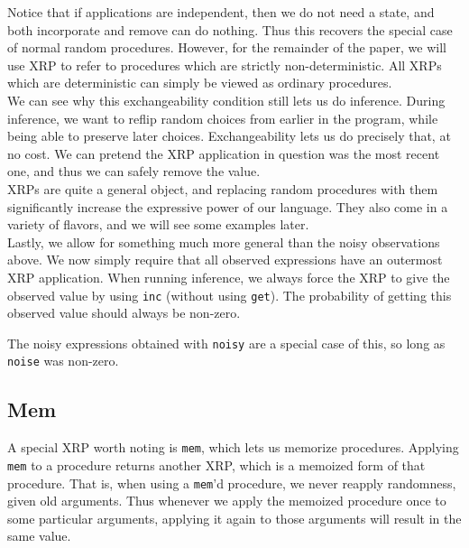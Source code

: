 \documentclass[10pt]{article}
\begin{document}
Notice that if applications are independent, then we do not need a state, and both incorporate and remove can do nothing.  Thus this recovers the special case of normal random procedures.  However, for the remainder of the paper, we will use XRP to refer to procedures which are strictly non-deterministic.  All XRPs which are deterministic can simply be viewed as ordinary procedures. \\

We can see why this exchangeability condition still lets us do inference.  During inference, we want to reflip random choices from earlier in the program, while being able to preserve later choices.  Exchangeability lets us do precisely that, at no cost.  We can pretend the XRP application in question was the most recent one, and thus we can safely remove the value.  \\

XRPs are quite a general object, and replacing random procedures with them significantly increase the expressive power of our language.   They also come in a variety of flavors, and we will see some examples later. \\  %

Lastly, we allow for something much more general than the noisy observations above.  We now simply require that all observed expressions have an outermost XRP application.  When running inference, we always force the XRP to give the observed value by using {\tt inc} (without using {\tt get}).  The probability of getting this observed value should always be non-zero.  

The noisy expressions obtained with {\tt noisy} are a special case of this, so long as {\tt noise} was non-zero.  

\subsection{Mem}

A special XRP worth noting is {\tt mem}, which lets us memorize procedures.  Applying {\tt mem} to a procedure returns another XRP, which is a memoized form of that procedure.  That is, when using a {\tt mem}'d procedure, we never reapply randomness, given old arguments.  Thus whenever we apply the memoized procedure once to some particular arguments, applying it again to those arguments will result in the same value. 
\end{document}
